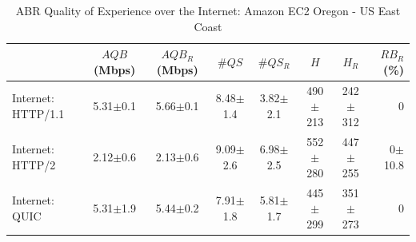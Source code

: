 \begin{table}[h]
\centering
 \begin{tabular}{ | l | c | c | c | c | c | c | r | }
    \hline
      & $AQB$ (Mbps) &  $AQB_{R}$ (Mbps) & $\#QS$ & $\#QS_{R}$ & $H$ & $H_{R}$ & $RB_{R}$(\%)\\ \hline \hline
     Internet: HTTP/1.1 & 5.31$\pm$0.1 & 5.66$\pm$0.1  & 8.48$\pm$1.4 & 3.82$\pm$2.1 & 490$\pm$213 & 242$\pm$312 & 0 \\ \hline
     Internet: HTTP/2 & 2.12$\pm$0.6 & 2.13$\pm$0.6  & 9.09$\pm$2.6 & 6.98$\pm$2.5 & 552$\pm$280 & 447$\pm$255  & 0$\pm$10.8\\ \hline
     Internet: QUIC & 5.31$\pm$1.9 & 5.44$\pm$0.2  & 7.91$\pm$1.8 & 5.81$\pm$1.7 & 445$\pm$299 & 351$\pm$273  & 0\\
    \hline
  \end{tabular}
  \caption{ABR Quality of Experience over the Internet: Amazon EC2 Oregon - US East Coast}
  \vspace{-20pt}
    \label{tab:qoe_abr_internet}
    \centering
\end{table}
